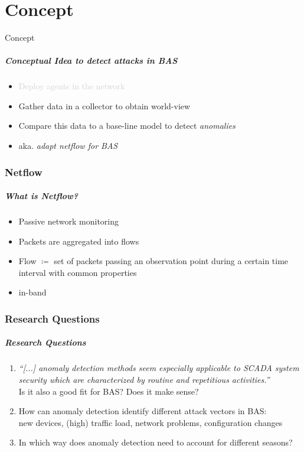\part{Concept}
\label{part:concept}

\begin{frame}[c]
	\centering
	\LARGE Concept
\end{frame}

\begin{frame}[c]
\frametitle{Conceptual Idea to detect attacks in BAS}
\begin{itemize}
	\item \textcolor{lightgray}{Deploy agents in the network}
	\item Gather data in a collector to obtain world-view
	\item Compare this data to a base-line model to detect \textit{anomalies}
	\item aka. \textit{adapt netflow for BAS}
\end{itemize}
\end{frame}

\section{Netflow}
\begin{frame}[c]
	\frametitle{What is Netflow?}
	\begin{itemize}
		\item Passive network monitoring
		\item Packets are aggregated into flows \parencite{Hofstede2014}
		\item Flow $\coloneqq$ set of packets passing an observation point during a certain time interval with common properties \parencite{Claise2013}
		\item in-band
	\end{itemize}
\end{frame}

\section{Research Questions}
\begin{frame}[c]
	\frametitle{Research Questions}
	\begin{enumerate}
		\item \textit{\enquote{[...] anomaly detection methods seem especially applicable to SCADA system security which are characterized by routine and repetitious activities.}} \parencite{Yang2006}\\
			Is it also a good fit for BAS? Does it make sense?
		\item How can anomaly detection identify different attack vectors in BAS:\\
			{\small new devices, (high) traffic load, network problems, configuration changes}
		\item In which way does anomaly detection need to account for different seasons?
	\end{enumerate}
\end{frame}

